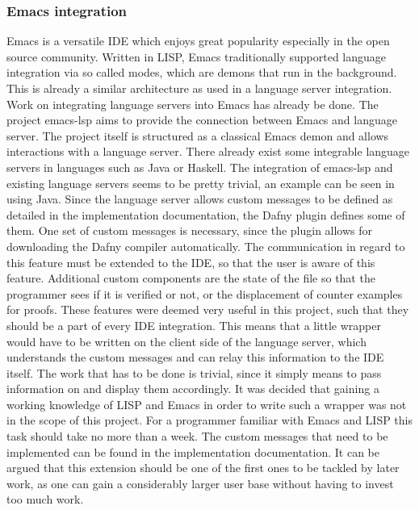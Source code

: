\subsubsection{Emacs integration}
Emacs \cite{GNU} is a versatile IDE which enjoys great popularity especially in the open source community. Written in LISP, Emacs traditionally supported language integration via so called modes, which are demons that run in the background. This is already a similar architecture as used in a language server integration. \newline
Work on integrating language servers into Emacs has already be done. The project emacs-lsp \cite{emacsLsp} aims to provide the connection between Emacs and language server. The project itself is structured as a classical Emacs demon and allows interactions with a language server. There already exist some integrable language servers in languages such as Java or Haskell. The integration of emacs-lsp and existing language servers seems to be pretty trivial, an example can be seen in \cite{javaEmacs} using Java. \newline
Since the language server allows custom messages to be defined as detailed in the implementation documentation, the Dafny plugin defines some of them. One set of custom messages is necessary, since the plugin allows for downloading the Dafny compiler automatically. The communication in regard to this feature must be extended to the IDE, so that the user is aware of this feature. Additional custom components are the state of the file so that the programmer sees if it is verified or not, or the displacement of counter examples for proofs.\newline
These features were deemed very useful in this project, such that they should be a part of every IDE integration. This means that a little wrapper would have to be written on the client side of the language server, which understands the custom messages and can relay this information to the IDE itself. The work that has to be done is trivial, since it simply means to pass information on and display them accordingly. \newline
It was decided that gaining a working knowledge of LISP and Emacs in order to write such a wrapper was not in the scope of this project. For a programmer familiar with Emacs and LISP this task should take no more than a week. The custom messages that need to be implemented can be found in the implementation documentation. It can be argued that this extension should be one of the first ones to be tackled by later work, as one can gain a considerably larger user base without having to invest too much work. 
